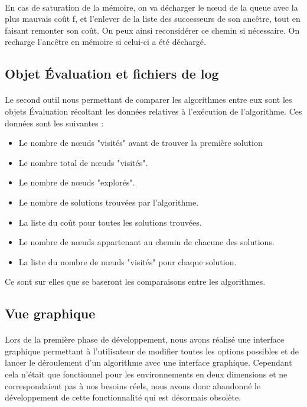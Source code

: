 \documentclass[pidr]{tnreport}
\begin{document}
\paragraph{}	
En cas de saturation de la mémoire, on va décharger le nœud de la queue avec la plus mauvais coût f, et l'enlever de la liste des successeurs de son ancêtre, tout en faisant remonter son coût. On peux ainsi reconsidérer ce chemin si nécessaire. On recharge l'ancêtre en mémoire si celui-ci a été déchargé.

		\subsection{Objet Évaluation et fichiers de log}
\paragraph{}
Le second outil nous permettant de comparer les algorithmes entre eux sont les objets Évaluation récoltant les données relatives à l'exécution de l'algorithme. Ces données sont les suivantes :

\begin{itemize}
	
	\item Le nombre de nœuds "visités" avant de trouver la première solution
	\item Le nombre total de nœuds "visités".
	\item Le nombre de nœuds "explorés".
	\item Le nombre de solutions trouvées par l'algorithme.
	\item La liste du coût pour toutes les solutions trouvées.
	\item Le nombre de nœuds appartenant au chemin de chacune des solutions.
	\item La liste du nombre de nœuds "visités" pour chaque solution.

\end{itemize}

Ce sont sur elles que se baseront les comparaisons entre les algorithmes. 		
		
		\subsection{Vue graphique}		
		
\paragraph{}
Lors de la première phase de développement, nous avons réalisé une interface graphique permettant à l'utilisateur de modifier toutes les options possibles et de lancer le déroulement d'un algorithme avec une interface graphique. Cependant cela n'était que fonctionnel pour les environnements en deux dimensions et ne correspondaient pas à nos besoins réels, nous avons donc abandonné le développement de cette fonctionnalité qui est désormais obsolète.
\end{document}
